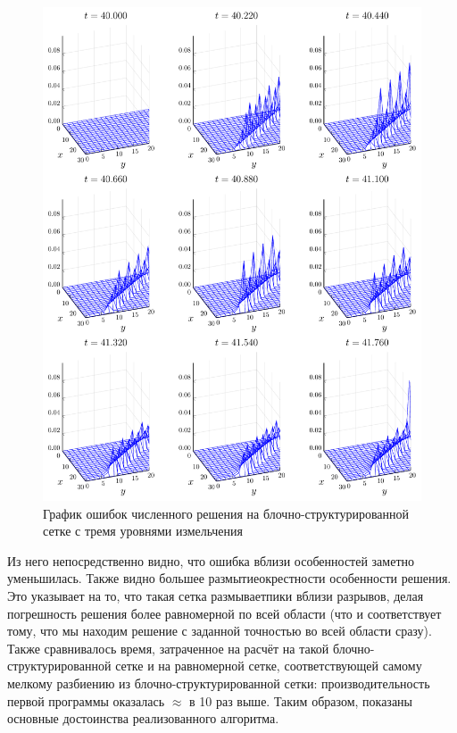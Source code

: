 \begin{figure}
    \centering
    \includegraphics[width=\textwidth, height=\textheight, keepaspectratio]{Теория_блочных_локально_адаптивных_сеток/Результаты_моделирования/errors_after.pdf}
    \caption{График ошибок численного решения на блочно-структурированной сетке с тремя уровнями измельчения}
    \label{fig:structured_errors}
\end{figure}
Из него непосредственно видно, что ошибка вблизи особенностей заметно уменьшилась.
Также видно большее \glqq размытие\grqq окрестности особенности решения.
Это указывает на то, что такая сетка \glqq размывает\grqq пики вблизи разрывов, делая погрешность решения более равномерной по всей области (что и соответствует тому, что мы находим решение с заданной точностью во всей области сразу).
Также сравнивалось время, затраченное на расчёт на такой блочно-структурированной сетке и на равномерной сетке, соответствующей самому мелкому разбиению из блочно-структурированной сетки: производительность первой программы оказалась $\approx$ в 10 раз выше.
Таким образом, показаны основные достоинства реализованного алгоритма.

